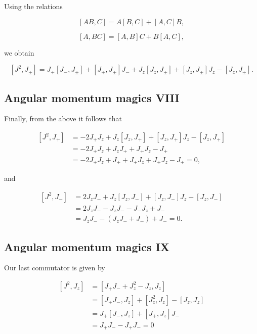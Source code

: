 \documentclass[11pt]{article}
\begin{document}
Using the relations

    \hypertarget{eq:abux2cc}{}

\[
\begin{equation}
[AB,C] = A[B,C] + [A,C]B, \label{eq:ab,c} \tag{7} 
\end{equation}
\]

    \hypertarget{eq:aux2cbc}{}

\[
\begin{equation} 
[A,BC] = [A,B]C + B[A,C], \label{eq:a,bc} \tag{8}
\end{equation}
\]

    we obtain

    \[
[J^2, J_\pm] =
J_+ [J_-,J_\pm] + [J_+,J_\pm] J_- + J_z [J_z,J_\pm] + [J_z,J_\pm] J_z - [J_z,J_\pm].
\]

    \hypertarget{angular-momentum-magics-viii}{%
\subsection{Angular momentum magics
VIII}\label{angular-momentum-magics-viii}}

Finally, from the above it follows that

    \[
\begin{align*}
[J^2, J_+] &= -2J_+ J_z + J_z [J_z,J_+] + [J_z,J_+] J_z - [J_z,J_+] \\
&= -2J_+ J_z + J_z J_+ + J_+ J_z - J_+ \\
&= -2J_+ J_z + J_+ + J_+ J_z + J_+ J_z - J_+ = 0,
\end{align*}
\]

    and

    \[
\begin{align*}
[J^2, J_-] &= 2J_z J_- + J_z [J_z,J_-] + [J_z,J_-] J_z - [J_z,J_-] \\
&= 2J_z J_- - J_z J_- - J_- J_z + J_- \\
&= J_z J_- - (J_z J_- + J_-) + J_- = 0.
\end{align*}
\]

    \hypertarget{angular-momentum-magics-ix}{%
\subsection{Angular momentum magics
IX}\label{angular-momentum-magics-ix}}

Our last commutator is given by

    \[
\begin{align*}
[J^2,J_z] &= [J_+ J_- + J_z^2 - J_z, J_z] \\
&= [J_+ J_-, J_z] + [J_z^2, J_z] - [J_z, J_z] \\
&= J_+ [J_-, J_z] + [J_+,J_z] J_- \\
&= J_+ J_- - J_+ J_- = 0
\end{align*}
\]
\end{document}
